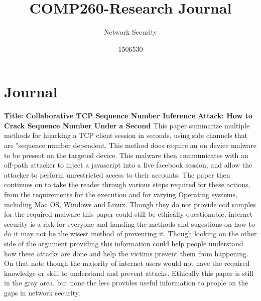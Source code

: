 \documentclass{scrartcl}
\title{COMP260-Research Journal}
\subtitle{Network Security}
\author{1506530}
\begin{document}
	
	
	\maketitle
	\section{Journal}
	
	\newline
	\newline
	\textbf{Title: Collaborative TCP Sequence Number Inference Attack: How to Crack Sequence Number Under a Second \cite{Inference}}
	\newline
This paper summarize multiple methods for hijacking a TCP client session in seconds, using side channels that are "sequence number dependent. This method does require an on device malware to be present on the targeted device. This malware then communicates with an off-path attacker to inject a javascript into a live facebook session, and allow the attacker to perform unrestricted access to their accounts. The paper then continues on to take the reader through various steps required for these actions, from the requirements for the execution and for varying Operating systems, including Mac OS, Windows and Linux. Though they do not provide cod samples for the required malware this paper could still be ethically questionable, internet security is a risk for everyone and handing the methods and sugestions on how to do it may not be the wisest method of preventing it. Though looking on the other side of the argument providing this information could help people understand how these attacks are done and help the victims prevent them from happening. On that note though the majority of internet users would not have the required knowledge or skill to understand and prevent attacks. Ethically this paper is still in the gray area, but none the less provides useful information to people on the gaps in network security.
	\newline
\end{document}
